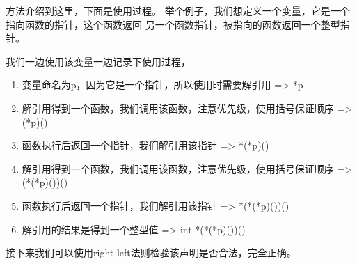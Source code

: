 方法介绍到这里，下面是使用过程。
举个例子，我们想定义一个变量，它是一个指向函数的指针，这个函数返回
另一个函数指针，被指向的函数返回一个整型指针。

我们一边使用该变量一边记录下使用过程，
\begin{enumerate}
  \item 变量命名为p，因为它是一个指针，所以使用时需要解引用 => *p
  \item 解引用得到一个函数，我们调用该函数，注意优先级，使用括号保证顺序 => (*p)()
  \item 函数执行后返回一个指针，我们解引用该指针 => *(*p)()
  \item 解引用得到一个函数，我们调用该函数，注意优先级，使用括号保证顺序 => (*(*p)())()
  \item 函数执行后返回一个指针，我们解引用该指针 => *(*(*p)())()
  \item 解引用的结果是得到一个整型值 => int *(*(*p)())()
\end{enumerate}
接下来我们可以使用right-left法则检验该声明是否合法，完全正确。